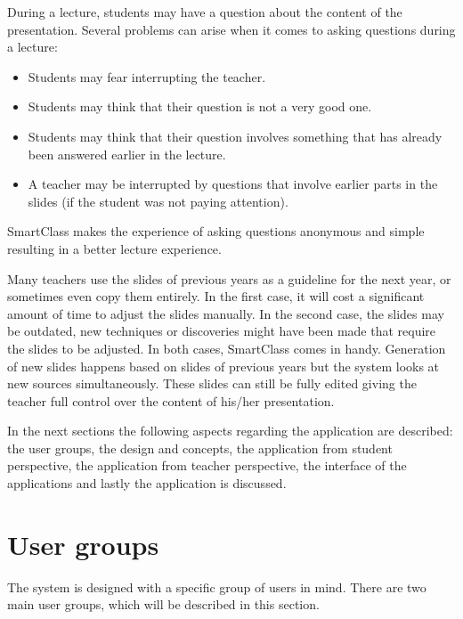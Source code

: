 \documentclass[11pt]{article}
\begin{document}
During a lecture, students may have a question about the content of the presentation. Several problems can arise when it comes to asking questions during a lecture:
\begin{itemize}
\item Students may fear interrupting the teacher.
\item Students may think that their question is not a very good one.
\item Students may think that their question involves something that has already been answered earlier in the lecture. 
\item A teacher may be interrupted by questions that involve earlier parts in the slides (if the student was not paying attention).
\end{itemize}
SmartClass makes the experience of asking questions anonymous and simple resulting in a better lecture experience.

Many teachers use the slides of previous years as a guideline for the next year, or sometimes even copy them entirely. In the first case, it will cost a significant amount of time to adjust the slides manually. In the second case, the slides may be outdated, new techniques or discoveries might have been made that require the slides to be adjusted. In both cases, SmartClass comes in handy.  Generation of new slides happens based on slides of previous years but the system looks at new sources simultaneously. These slides can still be fully edited giving the teacher full control over the content of his/her presentation. 

In the next sections the following aspects regarding the application are described: the user groups, the design and concepts, the application from student perspective, the application from teacher perspective, the interface of the applications and lastly the application is discussed. 

\section{User groups}
The system is designed with a specific group of users in mind. There are two main user groups, which will be described in this section.
\end{document}
